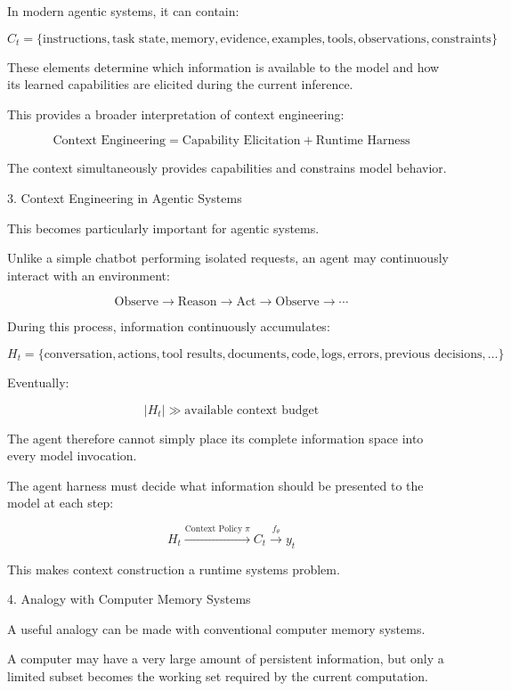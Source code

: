 In modern agentic systems, it can contain:

$$ C_t= \{ \text{instructions}, \text{task state}, \text{memory}, \text{evidence}, \text{examples}, \text{tools}, \text{observations}, \text{constraints} \} $$

These elements determine which information is available to the model and how its learned capabilities are elicited during the current inference.

This provides a broader interpretation of context engineering:

$$ \boxed{ \text{Context Engineering} = \text{Capability Elicitation} + \text{Runtime Harness} } $$

The context simultaneously provides capabilities and constrains model behavior.

3. Context Engineering in Agentic Systems

This becomes particularly important for agentic systems.

Unlike a simple chatbot performing isolated requests, an agent may continuously interact with an environment:

$$ \text{Observe} \rightarrow \text{Reason} \rightarrow \text{Act} \rightarrow \text{Observe} \rightarrow \cdots $$

During this process, information continuously accumulates:

$$ H_t= \{ \text{conversation}, \text{actions}, \text{tool results}, \text{documents}, \text{code}, \text{logs}, \text{errors}, \text{previous decisions}, \ldots \} $$

Eventually:

$$ |H_t| \gg \text{available context budget} $$

The agent therefore cannot simply place its complete information space into every model invocation.

The agent harness must decide what information should be presented to the model at each step:

$$ H_t \xrightarrow{\text{Context Policy }\pi} C_t \xrightarrow{f_\theta} y_t $$

This makes context construction a runtime systems problem.

4. Analogy with Computer Memory Systems

A useful analogy can be made with conventional computer memory systems.

A computer may have a very large amount of persistent information, but only a limited subset becomes the working set required by the current computation.

